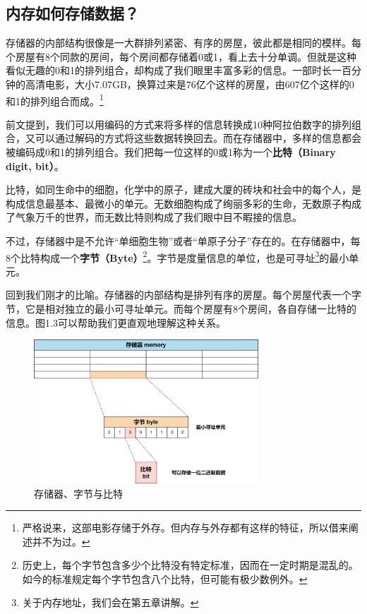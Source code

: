 \subsection*{内存如何存储数据？}
存储器的内部结构很像是一大群排列紧密、有序的房屋，彼此都是相同的模样。每个房屋有8个同款的房间，每个房间都存储着0或1，看上去十分单调。但就是这种看似无趣的0和1的排列组合，却构成了我们眼里丰富多彩的信息。一部时长一百分钟的高清电影，大小7.07GB，换算过来是76亿个这样的房屋，由607亿个这样的0和1的排列组合而成。\footnote{严格说来，这部电影存储于外存。但内存与外存都有这样的特征，所以借来阐述并不为过。}\par
前文提到，我们可以用编码的方式来将多样的信息转换成10种阿拉伯数字的排列组合，又可以通过解码的方式将这些数据转换回去。而在存储器中，多样的信息都会被编码成0和1的排列组合。我们把每一位这样的0或1称为一个\textbf{比特（Binary digit, bit）}。\par
比特，如同生命中的细胞，化学中的原子，建成大厦的砖块和社会中的每个人，是构成信息最基本、最微小的单元。无数细胞构成了绚丽多彩的生命，无数原子构成了气象万千的世界，而无数比特则构成了我们眼中目不睱接的信息。\par
不过，存储器中是不允许``单细胞生物''或者``单原子分子''存在的。在存储器中，每8个比特构成一个\textbf{字节（Byte）}\footnote{历史上，每个字节包含多少个比特没有特定标准，因而在一定时期是混乱的。如今的标准规定每个字节包含八个比特，但可能有极少数例外。}。字节是度量信息的单位，也是可寻址\footnote{关于内存地址，我们会在第五章讲解。}的最小单元。\par
回到我们刚才的比喻。存储器的内部结构是排列有序的房屋。每个房屋代表一个字节，它是相对独立的最小可寻址单元。而每个房屋有8个房间，各自存储一比特的信息。图1.3可以帮助我们更直观地理解这种关系。\par
\begin{figure}[htbp]
    \centering
    \includegraphics[width=0.75\textwidth]{../images/generalized_parts/01_Memory_byte_and_bit.drawio.png}
    \caption{存储器、字节与比特}
\end{figure}

